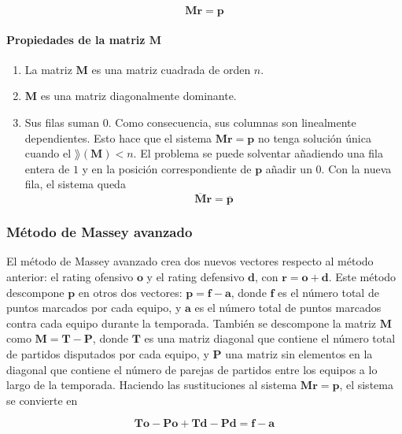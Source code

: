\[ \mathbf{M r} = \mathbf{p} \]

\paragraph*{Propiedades de la matriz $\mathbf{M}$}

\begin{enumerate}
\item La matriz $\mathbf{M}$ es una matriz cuadrada de orden $n$.
\item $\mathbf{M}$ es una matriz diagonalmente dominante.
\item Sus filas suman $0$. Como consecuencia, sus columnas son linealmente dependientes. Esto hace que el sistema  $\mathbf{M r} = \mathbf{p}$ no tenga solución única cuando el $\rang(\mathbf{M}) < n$. El problema se puede solventar añadiendo una fila entera de $1$ y en la posición correspondiente de $\mathbf{p}$ añadir un $0$. Con la nueva fila, el sistema queda 
\begin{equation}
\overline{\mathbf{M}} \mathbf{r} = \overline{\mathbf{p}} \label{eq:massey_general}
\end{equation}
\end{enumerate}


\subsubsection{Método de Massey avanzado}

El método de Massey avanzado crea dos nuevos vectores respecto al método anterior: el rating ofensivo $\mathbf{o}$ y el rating defensivo $\mathbf{d}$, con $\mathbf{r} = \mathbf{o} + \mathbf{d}$. Este método descompone $\mathbf{p}$ en otros dos vectores: $ \mathbf{p} = \mathbf{f} - \mathbf{a}$, donde $\mathbf{f}$ es el número total de puntos marcados por cada equipo, y $\mathbf{a}$ es el número total de puntos marcados contra cada equipo durante la temporada. También se descompone la matriz $\mathbf{M}$ como $\mathbf{M} = \mathbf{T} - \mathbf{P}$, donde $\mathbf{T}$ es una matriz diagonal que contiene el número total de partidos disputados por cada equipo, y $\mathbf{P}$ una matriz sin elementos en la diagonal que contiene el número de parejas de partidos entre los equipos a lo largo de la temporada. Haciendo las sustituciones al sistema $\mathbf{M r } = \mathbf{p}$, el sistema se convierte en

\begin{equation}
\mathbf{T o} - \mathbf{P o} + \mathbf{T d} - \mathbf{P d} = \mathbf{f} - \mathbf{a}
\end{equation}

